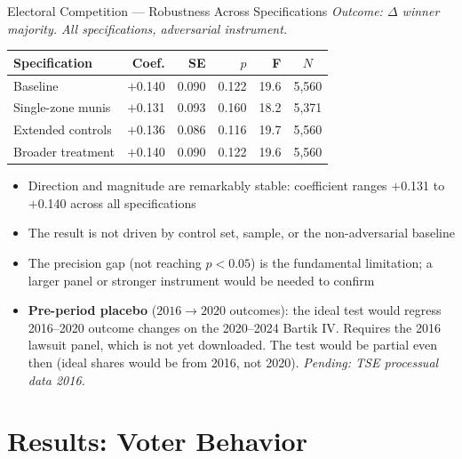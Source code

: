 \documentclass[aspectratio=169,10pt]{beamer}
\begin{document}
\begin{frame}{Electoral Competition --- Robustness Across Specifications}
\footnotesize
\textit{Outcome: $\Delta$ winner majority. All specifications, adversarial instrument.}
\smallskip
\renewcommand{\arraystretch}{1.2}
\begin{tabular}{L{4.2cm}rrrrc}
  \toprule
  Specification & Coef. & SE & $p$ & F & $N$ \\
  \midrule
  Baseline          & $+$0.140 & 0.090 & 0.122 & 19.6 & 5,560 \\
  Single-zone munis & $+$0.131 & 0.093 & 0.160 & 18.2 & 5,371 \\
  Extended controls & $+$0.136 & 0.086 & 0.116 & 19.7 & 5,560 \\
  Broader treatment & $+$0.140 & 0.090 & 0.122 & 19.6 & 5,560 \\
  \bottomrule
\end{tabular}
\normalsize
\bigskip
\begin{itemize}
  \item Direction and magnitude are remarkably stable: coefficient ranges $+$0.131 to $+$0.140 across all specifications
  \item The result is not driven by control set, sample, or the non-adversarial baseline
  \item The precision gap (not reaching $p < 0.05$) is the fundamental limitation; a larger panel or stronger instrument would be needed to confirm
  \item \textbf{Pre-period placebo} ($2016\to2020$ outcomes): the ideal test would regress 2016–2020 outcome changes on the 2020–2024 Bartik IV. Requires the 2016 lawsuit panel, which is not yet downloaded. The test would be partial even then (ideal shares would be from 2016, not 2020). \emph{Pending: TSE processual data 2016.}
\end{itemize}
\end{frame}


\section{Results: Voter Behavior}
\end{document}
